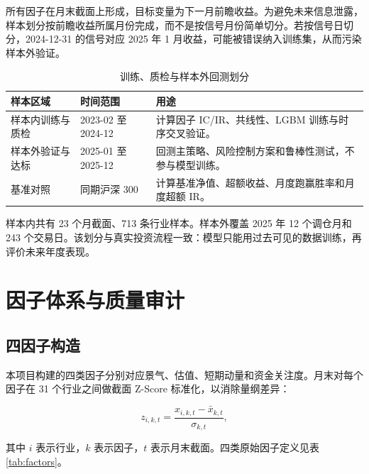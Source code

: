 \documentclass[UTF8,a4paper,12pt]{ctexart}
\begin{document}
所有因子在月末截面上形成，目标变量为下一月前瞻收益。为避免未来信息泄露，样本划分按前瞻收益所属月份完成，而不是按信号月份简单切分。若按信号日切分，2024-12-31 的信号对应 2025 年 1 月收益，可能被错误纳入训练集，从而污染样本外验证。

\begin{table}[H]
    \centering
    \caption{训练、质检与样本外回测划分}
    \label{tab:sample-split}
    \begin{tabular}{L{0.24\textwidth}L{0.26\textwidth}L{0.38\textwidth}}
        \toprule
        样本区域 & 时间范围 & 用途 \\
        \midrule
        样本内训练与质检 & 2023-02 至 2024-12 & 计算因子 IC/IR、共线性、LGBM 训练与时序交叉验证。 \\
        样本外验证与达标 & 2025-01 至 2025-12 & 回测主策略、风险控制方案和鲁棒性测试，不参与模型训练。 \\
        基准对照 & 同期沪深 300 & 计算基准净值、超额收益、月度跑赢胜率和月度超额 IR。 \\
        \bottomrule
    \end{tabular}
\end{table}

样本内共有 23 个月截面、713 条行业样本。样本外覆盖 2025 年 12 个调仓月和 243 个交易日。该划分与真实投资流程一致：模型只能用过去可见的数据训练，再评价未来年度表现。

\section{因子体系与质量审计}

\subsection{四因子构造}

本项目构建的四类因子分别对应景气、估值、短期动量和资金关注度。月末对每个因子在 31 个行业之间做截面 Z-Score 标准化，以消除量纲差异：

\begin{equation}
z_{i,k,t}=\frac{x_{i,k,t}-\bar{x}_{k,t}}{\sigma_{k,t}},
\end{equation}

其中 $i$ 表示行业，$k$ 表示因子，$t$ 表示月末截面。四类原始因子定义见表 \ref{tab:factors}。
\end{document}

